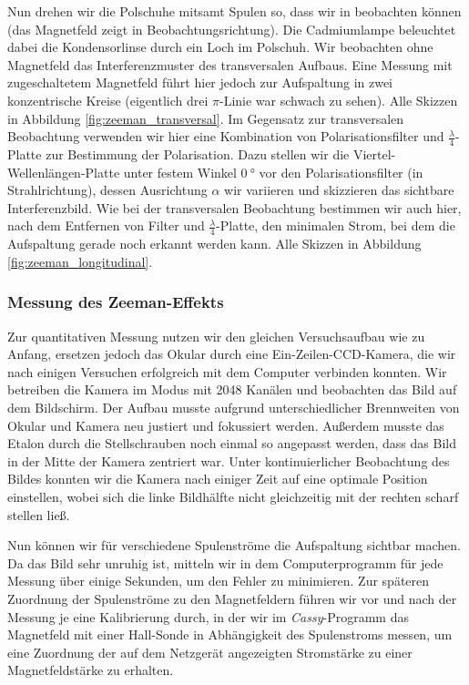 \documentclass[11pt, a4paper]{article}
\begin{document}
Nun drehen wir die Polschuhe mitsamt Spulen so, dass wir in  beobachten können (das Magnetfeld zeigt in Beobachtungsrichtung).
Die Cadmiumlampe beleuchtet dabei die Kondensorlinse durch ein Loch im Polschuh.
Wir beobachten ohne Magnetfeld das Interferenzmuster des transversalen Aufbaus.
Eine Messung mit zugeschaltetem Magnetfeld führt hier jedoch zur Aufspaltung in zwei konzentrische Kreise (eigentlich drei $\pi$-Linie war schwach zu sehen).
Alle Skizzen in Abbildung \ref{fig:zeeman_transversal}.
Im Gegensatz zur transversalen Beobachtung verwenden wir hier eine Kombination von Polarisationsfilter und $\frac{\lambda}{4}$-Platte zur Bestimmung der Polarisation.
Dazu stellen wir die Viertel-Wellenlängen-Platte unter festem Winkel $\SI{0}{\degree}$ vor den Polarisationsfilter (in Strahlrichtung), dessen Ausrichtung $\alpha$ wir variieren und skizzieren das sichtbare Interferenzbild.
Wie bei der transversalen Beobachtung bestimmen wir auch hier, nach dem Entfernen von Filter und $\frac{\lambda}{4}$-Platte, den minimalen Strom, bei dem die Aufspaltung gerade noch erkannt werden kann.
Alle Skizzen in Abbildung \ref{fig:zeeman_longitudinal}.

\subsubsection{Messung des Zeeman-Effekts}

Zur quantitativen Messung nutzen wir den gleichen Versuchsaufbau wie zu Anfang, ersetzen jedoch das Okular durch eine Ein-Zeilen-CCD-Kamera, die wir nach einigen Versuchen erfolgreich mit dem Computer verbinden konnten.
Wir betreiben die Kamera im Modus mit 2048 Kanälen und beobachten das Bild auf dem Bildschirm.
Der Aufbau musste aufgrund unterschiedlicher Brennweiten von Okular und Kamera neu justiert und fokussiert werden.
Außerdem musste das Etalon durch die Stellschrauben noch einmal so angepasst werden, dass das Bild in der Mitte der Kamera zentriert war.
Unter kontinuierlicher Beobachtung des Bildes konnten wir die Kamera nach einiger Zeit auf eine optimale Position einstellen, wobei sich die linke Bildhälfte nicht gleichzeitig mit der rechten scharf stellen ließ.

Nun können wir für verschiedene Spulenströme die Aufspaltung sichtbar machen.
Da das Bild sehr unruhig ist, mitteln wir in dem Computerprogramm für jede Messung über einige Sekunden, um den Fehler zu minimieren.
Zur späteren Zuordnung der Spulenströme zu den Magnetfeldern führen wir vor und nach der Messung je eine Kalibrierung durch, in der wir im \emph{Cassy}-Programm das Magnetfeld mit einer Hall-Sonde in Abhängigkeit des Spulenstroms messen, um eine Zuordnung der auf dem Netzgerät angezeigten Stromstärke zu einer Magnetfeldstärke zu erhalten.
\end{document}
